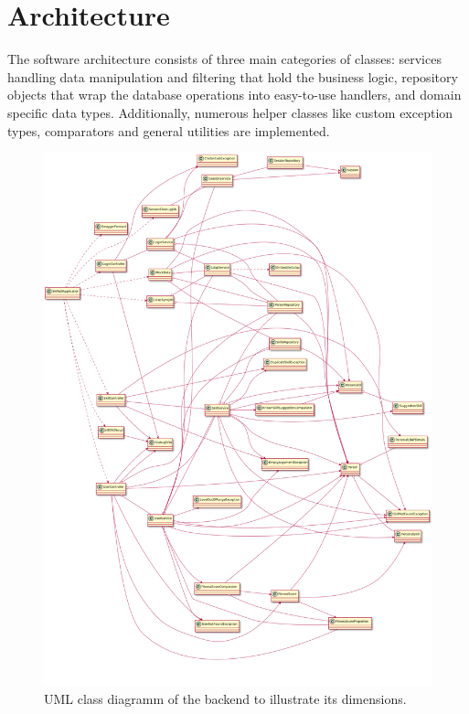 \section{Architecture}
The software architecture consists of three main categories of classes: services handling data manipulation and filtering that hold the business logic, repository objects that wrap the database operations into easy-to-use handlers, and domain specific data types. Additionally, numerous helper classes like custom exception types, comparators and general utilities are implemented.
\begin{figure}[!h]
    \centering
    \includegraphics[height=0.55\textheight]{images/uml.png}
    \caption[Backend Class Diagramm]{UML class diagramm of the backend to illustrate its dimensions.}
    \label{fig:markovchain}
\end{figure}
\newpage

